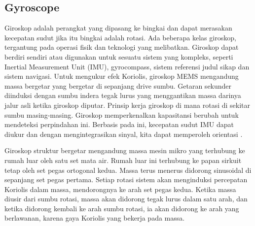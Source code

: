 \subsection{Gyroscope}
Giroskop adalah perangkat yang dipasang ke bingkai dan dapat merasakan kecepatan sudut jika itu bingkai adalah rotasi. Ada beberapa kelas giroskop, tergantung pada operasi fisik dan 
teknologi yang melibatkan. Giroskop dapat berdiri sendiri atau digunakan untuk sesuatu sistem yang kompleks, seperti Inertial Measurement Unit (IMU), gyrocompass, sistem referensi judul 
sikap dan sistem navigasi. Untuk mengukur efek Koriolis, giroskop MEMS mengandung massa bergetar yang bergetar di sepanjang drive sumbu. Getaran sekunder diinduksi 
dengan sumbu indera tegak lurus yang menggantikan massa darinya jalur asli ketika giroskop diputar. Prinsip kerja giroskop di mana rotasi di sekitar sumbu masing-masing. 
Giroskop memperkenalkan kapasitansi berubah untuk mendeteksi perpindahan ini. Berbasis pada ini, kecepatan sudut IMU dapat diukur dan dengan mengintegrasikan sinyal, kita dapat memperoleh
orientasi \parencite{Passaro2017}.

Giroskop struktur bergetar mengandung massa mesin mikro yang terhubung ke rumah luar oleh satu set mata air. Rumah luar ini terhubung ke papan sirkuit tetap oleh set pegas ortogonal 
kedua. Massa terus menerus didorong sinusoidal di sepanjang set pegas pertama. Setiap rotasi sistem akan menginduksi percepatan Koriolis dalam massa, mendorongnya ke arah set pegas 
kedua. Ketika massa diusir dari sumbu rotasi, massa akan didorong tegak lurus dalam satu arah, dan ketika didorong kembali ke arah sumbu rotasi, ia akan didorong ke arah yang 
berlawanan, karena gaya Koriolis yang bekerja pada massa.

